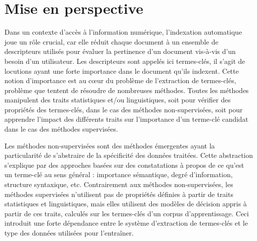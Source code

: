   \section{Mise en perspective}
    Dans un contexte d'accès à l'information numérique, l'indexation automatique
    joue un rôle crucial, car elle réduit chaque document à un ensemble de
    descripteurs utilisés pour évaluer la pertinence d'un document vis-à-vis
    d'un besoin d'un utilisateur. Les descripteurs sont appelés ici termes-clés,
    il s'agit de locutions ayant une forte importance dans le document qu'ils
    indexent. Cette notion d'importance est au c\oe{}ur du problème de
    l'extraction de termes-clés, problème que tentent de résoudre de nombreuses
    méthodes. Toutes les méthodes manipulent des traits statistiques et/ou
    linguistiques, soit pour vérifier des propriétés des termes-clés, dans le
    cas des méthodes non-supervisées, soit pour apprendre l'impact des
    différents traits sur l'importance d'un terme-clé candidat dans le cas des
    méthodes supervisées.

    Les méthodes non-supervisées sont des méthodes émergentes ayant la
    particularité de s'abstraire de la spécificité des données traitées. Cette
    abstraction s'explique par des approches basées sur des constatations à
    propos de ce qu'est un terme-clé au sens général : importance sémantique,
    degré d'information, structure syntaxique, etc. Contrairement aux méthodes
    non-supervisées, les méthodes supervisées n'utilisent pas de propriétés
    définies à partir de traits statistiques et linguistiques, mais elles
    utilisent des modèles de décision appris à partir de ces traits, calculés
    sur les termes-clés d'un corpus d'apprentissage. Ceci introduit une forte
    dépendance entre le système d'extraction de termes-clés et le type des
    données utilisées pour l'entraîner.

